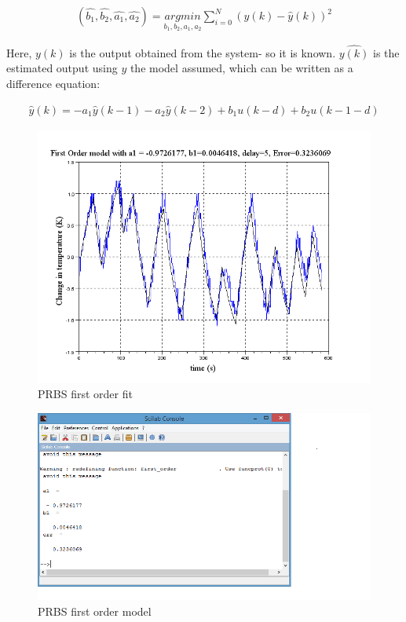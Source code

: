 \begin{align}
(\hat{b_1}, \hat{b_2}, \hat{a_1}, \hat{a_2})=\underset{b_1, b_2, a_1, a_2}{argmin}\sum_{i=0}^{N}(y(k)-\hat{y}(k))^{2}
\end{align}


Here, $y(k)$ is the output obtained from the system- so it is known. $\hat{y(k)}$ is the estimated output using $y$ the model 
assumed, which can be written as a difference equation:

\begin{align}
\hat{y}(k) = -a_1\hat{y}(k - 1) - a_2\hat{y}(k - 2) + b_1 u(k - d) + b_2 u(k - 1 - d)
\end{align}


\begin{figure}
\centering
\includegraphics[width=0.7\linewidth]{prbs/prbs-1-fit.png}
\caption{PRBS first order fit}
\label{prbs1-fit}
\end{figure}

\begin{figure}
\centering
\includegraphics[width=0.7\linewidth]{prbs/prbs-1-model.png}
\caption{PRBS first order model}
\label{prbs-1-model}
\end{figure}

